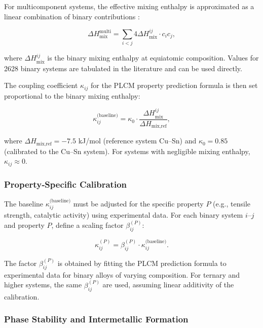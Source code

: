 \documentclass[12pt,a4paper]{article}
\begin{document}
	For multicomponent systems, the effective mixing enthalpy is approximated as a linear combination of binary contributions \cite{Takeuchi2010}:
	
	\begin{equation}
		\Delta H_{\text{mix}}^{\text{multi}} = \sum_{i<j} 4 \Delta H_{\text{mix}}^{ij} \cdot c_i c_j,
		\label{eq:multicomponent}
	\end{equation}
	
	where \(\Delta H_{\text{mix}}^{ij}\) is the binary mixing enthalpy at equiatomic composition. Values for 2628 binary systems are tabulated in the literature \cite{Takeuchi2010} and can be used directly.
	
	The coupling coefficient \(\kappa_{ij}\) for the PLCM property prediction formula is then set proportional to the binary mixing enthalpy:
	
	\begin{equation}
		\kappa_{ij}^{\text{(baseline)}} = \kappa_0 \cdot \frac{\Delta H_{\text{mix}}^{ij}}{\Delta H_{\text{mix,ref}}},
		\label{eq:kappa-miedema}
	\end{equation}
	
	where \(\Delta H_{\text{mix,ref}} = -7.5\) kJ/mol (reference system Cu–Sn) and \(\kappa_0 = 0.85\) (calibrated to the Cu–Sn system). For systems with negligible mixing enthalpy, \(\kappa_{ij} \approx 0\).
	
	\subsubsection{Property‑Specific Calibration}
	
	The baseline \(\kappa_{ij}^{\text{(baseline)}}\) must be adjusted for the specific property \(P\) (e.g., tensile strength, catalytic activity) using experimental data. For each binary system \(i\)–\(j\) and property \(P\), define a scaling factor \(\beta_{ij}^{(P)}\):
	
	\begin{equation}
		\kappa_{ij}^{(P)} = \beta_{ij}^{(P)} \cdot \kappa_{ij}^{\text{(baseline)}}.
		\label{eq:beta-calibration}
	\end{equation}
	
	The factor \(\beta_{ij}^{(P)}\) is obtained by fitting the PLCM prediction formula to experimental data for binary alloys of varying composition. For ternary and higher systems, the same \(\beta_{ij}^{(P)}\) are used, assuming linear additivity of the calibration.
	
	\subsubsection{Phase Stability and Intermetallic Formation}
	
\end{document}
